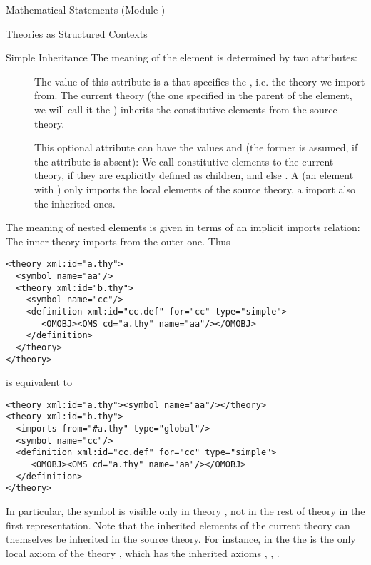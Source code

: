 \begin{tchapter}[id=statements,short=Mathematical Statements]{Mathematical Statements (Module {})}
\begin{tsection}[id=theories]{Theories as Structured Contexts}
\begin{tsubsection}[id=inheritance]{Simple Inheritance}
The meaning of the {} element is determined by two attributes:
\begin{description}
\item[{}] The value of this attribute is a
  {} that specifies the {}, i.e. the
  theory we import from.  The current theory (the one specified in the parent of the
  {} element, we will call it the {}) inherits
  the constitutive elements from the source theory.
\item[{}] This optional attribute can have the values
  {} and {} (the former is
  assumed, if the attribute is absent): We call constitutive elements {} to
  the current theory, if they are explicitly defined as children, and else
  {}. A {} (an {} element with
  {}) only imports the local elements of the source theory, a
  {} import also the inherited ones.
\end{description}
  The meaning of nested {} elements is given in terms of an
  implicit imports relation: The inner theory imports from the outer one. Thus
\begin{lstlisting}[label=lst:nested-thy,index={theory}]
<theory xml:id="a.thy">
  <symbol name="aa"/>
  <theory xml:id="b.thy">
    <symbol name="cc"/>
    <definition xml:id="cc.def" for="cc" type="simple">
       <OMOBJ><OMS cd="a.thy" name="aa"/></OMOBJ>
    </definition>
  </theory>
</theory>
\end{lstlisting}
is equivalent to 
\begin{lstlisting}[label=lst:nested-thy-equiv,index={theory}]
<theory xml:id="a.thy"><symbol name="aa"/></theory>
<theory xml:id="b.thy">
  <imports from="#a.thy" type="global"/>
  <symbol name="cc"/>
  <definition xml:id="cc.def" for="cc" type="simple">
     <OMOBJ><OMS cd="a.thy" name="aa"/></OMOBJ>
  </definition>
</theory>
\end{lstlisting}
In particular, the symbol {} is visible only in theory {}, not
in the rest of theory {} in the first representation.  Note that the
inherited elements of the current theory can themselves be inherited in the source
theory. For instance, in the {} the {} is the only
local axiom of the theory {}, which has the inherited axioms
{}, {}, {}.


\end{tsubsection}
\end{tsection}
\end{tchapter}

